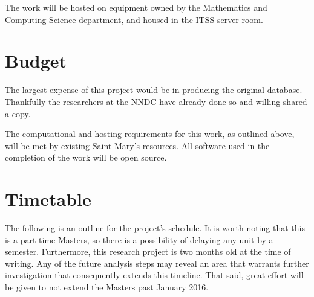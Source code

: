 \documentclass[12pt]{article}
\begin{document}
\begin{doublespacing}
The work will be hosted on equipment owned by the Mathematics and Computing Science department, and housed in the ITSS server room.

\section{Budget}
The largest expense of this project would be in producing the original database.
Thankfully the researchers at the NNDC have already done so and willing shared a copy.

The computational and hosting requirements for this work, as outlined above, will be met by existing Saint Mary's resources.
All software used in the completion of the work will be open source.

\pagebreak
\section{Timetable}

The following is an outline for the project's schedule.
It is worth noting that this is a part time Masters, so there is a possibility of delaying any unit by a semester.
Furthermore, this research project is two months old at the time of writing.
Any of the future analysis steps may reveal an area that warrants further investigation that consequently extends this timeline.
That said, great effort will be given to not extend the Masters past January 2016.


\end{doublespacing}
\end{document}
